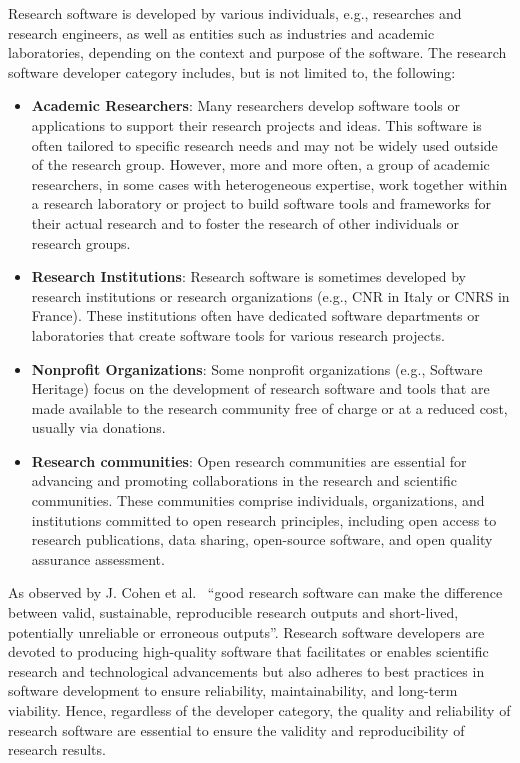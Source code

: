 Research software is developed by various individuals, e.g., researches and research engineers, as well as entities such as industries and academic laboratories, depending on the context and purpose of the software. 
The research software developer category includes, but is not limited to, the following: 
\begin{itemize}
\item \textbf{Academic Researchers}: Many researchers develop software tools or applications to support their research projects and ideas. This software is often tailored to specific research needs and may not be widely used outside of the research group. However, more and more often, a group of academic researchers, in some cases with heterogeneous expertise, work together within a research laboratory or project to build software tools and frameworks for their actual research and to foster the research of other individuals or research groups.

\item \textbf{Research Institutions}: Research software is sometimes developed by research institutions or research organizations (e.g., CNR in Italy or CNRS in France). These institutions often have dedicated software departments or laboratories that create software tools for various research projects.

\item \textbf{Nonprofit Organizations}: Some nonprofit organizations (e.g., Software Heritage) focus on the development of research software and tools that are made available to the research community free of charge or at a reduced cost, usually via donations.

\item \textbf{Research communities}: Open research communities are essential for advancing and promoting collaborations in the research and scientific communities. These communities comprise individuals, organizations, and institutions committed to open research principles, including open access to research publications, data sharing, open-source software, and open quality assurance assessment. 
\end{itemize}

As observed by J. Cohen et al.~\cite{TheFourPillarsOfRSE-2021} ``good research software can make the difference between valid, sustainable, reproducible research outputs and short-lived, potentially unreliable or erroneous outputs''.
Research software developers are devoted to producing high-quality software that facilitates or enables scientific research and technological advancements but also adheres to best practices in software development to ensure reliability, maintainability, and long-term viability. Hence, regardless of the developer category, the quality and reliability of research software are essential to ensure the validity and reproducibility of research results.

